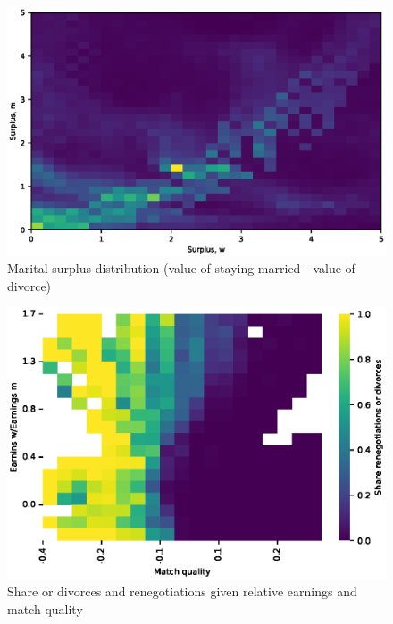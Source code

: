 \documentclass[]{article}
\begin{document}
\begin{figure}[H]
	\centering
	\includegraphics[width=\textwidth]{surplus_dist.eps} 
	\caption{Marital surplus distribution (value of staying married - value of divorce)}
	\label{fig:surplus dist}
\end{figure}

\begin{figure}[H]
	\centering
	\includegraphics[width=\textwidth]{match_earn_ren_div.eps} 
	\caption{Share or divorces and renegotiations given relative earnings and match quality}
	\label{fig:surplus match earn}
\end{figure}
\end{document}
